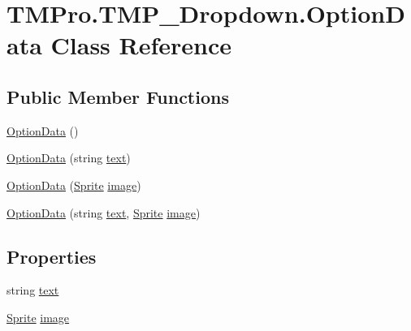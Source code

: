 \hypertarget{class_t_m_pro_1_1_t_m_p___dropdown_1_1_option_data}{}\section{T\+M\+Pro.\+T\+M\+P\+\_\+\+Dropdown.\+Option\+Data Class Reference}
\label{class_t_m_pro_1_1_t_m_p___dropdown_1_1_option_data}
\subsection*{Public Member Functions}
\begin{DoxyCompactItemize}
\item 
\mbox{\hyperlink{class_t_m_pro_1_1_t_m_p___dropdown_1_1_option_data_a653b593028b29eb36d0c54003ed5eaf9}{Option\+Data}} ()
\item 
\mbox{\hyperlink{class_t_m_pro_1_1_t_m_p___dropdown_1_1_option_data_a0e37d6281604ed9557b1177aa954602f}{Option\+Data}} (string \mbox{\hyperlink{class_t_m_pro_1_1_t_m_p___dropdown_1_1_option_data_aaa4fe424c6a5503e154e9861e3bfd122}{text}})
\item 
\mbox{\hyperlink{class_t_m_pro_1_1_t_m_p___dropdown_1_1_option_data_a4abb1db647c1397555934919b6cf7f20}{Option\+Data}} (\mbox{\hyperlink{namespace_t_m_pro_ab5662f47179bf1b81c575ecf80b24065a51f2b7b14433aa22c67d1f4fc18943cd}{Sprite}} \mbox{\hyperlink{class_t_m_pro_1_1_t_m_p___dropdown_1_1_option_data_ad484ec768284407cd422b47145aa2446}{image}})
\item 
\mbox{\hyperlink{class_t_m_pro_1_1_t_m_p___dropdown_1_1_option_data_a5d5f10ea3ae4b29b4f13c88582cefcdf}{Option\+Data}} (string \mbox{\hyperlink{class_t_m_pro_1_1_t_m_p___dropdown_1_1_option_data_aaa4fe424c6a5503e154e9861e3bfd122}{text}}, \mbox{\hyperlink{namespace_t_m_pro_ab5662f47179bf1b81c575ecf80b24065a51f2b7b14433aa22c67d1f4fc18943cd}{Sprite}} \mbox{\hyperlink{class_t_m_pro_1_1_t_m_p___dropdown_1_1_option_data_ad484ec768284407cd422b47145aa2446}{image}})
\end{DoxyCompactItemize}
\subsection*{Properties}
\begin{DoxyCompactItemize}
\item 
string \mbox{\hyperlink{class_t_m_pro_1_1_t_m_p___dropdown_1_1_option_data_aaa4fe424c6a5503e154e9861e3bfd122}{text}}
\item 
\mbox{\hyperlink{namespace_t_m_pro_ab5662f47179bf1b81c575ecf80b24065a51f2b7b14433aa22c67d1f4fc18943cd}{Sprite}} \mbox{\hyperlink{class_t_m_pro_1_1_t_m_p___dropdown_1_1_option_data_ad484ec768284407cd422b47145aa2446}{image}}
\end{DoxyCompactItemize}


